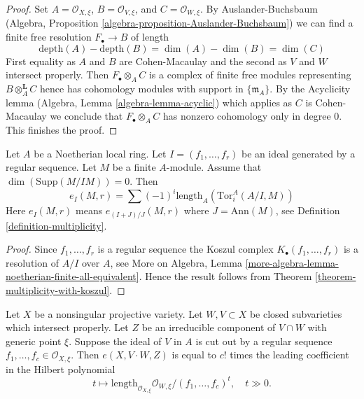 \begin{proof}
Set $A = \mathcal{O}_{X, \xi}$, $B = \mathcal{O}_{V, \xi}$, and
$C = \mathcal{O}_{W, \xi}$. By Auslander-Buchsbaum
(Algebra, Proposition \ref{algebra-proposition-Auslander-Buchsbaum})
we can find a finite free resolution $F_\bullet \to B$ of
length
$$
\text{depth}(A) - \text{depth}(B) =
\dim(A) - \dim(B) = \dim(C)
$$
First equality as $A$ and $B$ are Cohen-Macaulay and the second
as $V$ and $W$ intersect properly. Then $F_\bullet \otimes_A C$ is a
complex of finite free modules representing $B \otimes_A^\mathbf{L} C$
hence has cohomology modules with support in $\{\mathfrak m_A\}$.
By the Acyclicity lemma (Algebra, Lemma \ref{algebra-lemma-acyclic})
which applies as $C$ is Cohen-Macaulay
we conclude that $F_\bullet \otimes_A C$ has nonzero
cohomology only in degree $0$. This finishes the proof.
\end{proof}

\begin{lemma}
\label{lemma-one-ideal-ci}
Let $A$ be a Noetherian local ring. Let $I = (f_1, \dots, f_r)$ be an ideal
generated by a regular sequence. Let $M$ be a finite $A$-module. Assume that
$\dim(\text{Supp}(M/IM)) = 0$. Then
$$
e_I(M, r) = \sum (-1)^i\text{length}_A(\text{Tor}_i^A(A/I, M))
$$
Here $e_I(M, r)$ means $e_{(I + J)/J}(M, r)$ where $J = \text{Ann}(M)$, see
Definition \ref{definition-multiplicity}.
\end{lemma}

\begin{proof}
Since $f_1, \ldots, f_r$ is a regular sequence the Koszul complex
$K_\bullet(f_1, \ldots, f_r)$ is a resolution of $A/I$ over $A$, see
More on Algebra, Lemma
\ref{more-algebra-lemma-noetherian-finite-all-equivalent}.
Hence the result follows from Theorem \ref{theorem-multiplicity-with-koszul}.
\end{proof}

\begin{lemma}
\label{lemma-multiplicity-with-lci}
Let $X$ be a nonsingular projective variety. Let $W,V \subset X$ be
closed subvarieties which intersect properly. Let $Z$ be an irreducible
component of $V \cap W$ with generic point $\xi$.
Suppose the ideal of $V$ in $A$ is cut out by
a regular sequence $f_1, \ldots, f_c \in \mathcal{O}_{X, \xi}$.
Then $e(X, V\cdot W, Z)$ is equal to $c!$ times the leading coefficient in
the Hilbert polynomial
$$
t \mapsto \text{length}_{\mathcal{O}_{X, \xi}}
\mathcal{O}_{W, \xi}/(f_1, \ldots, f_c)^t,\quad t \gg 0.
$$
\end{lemma}


